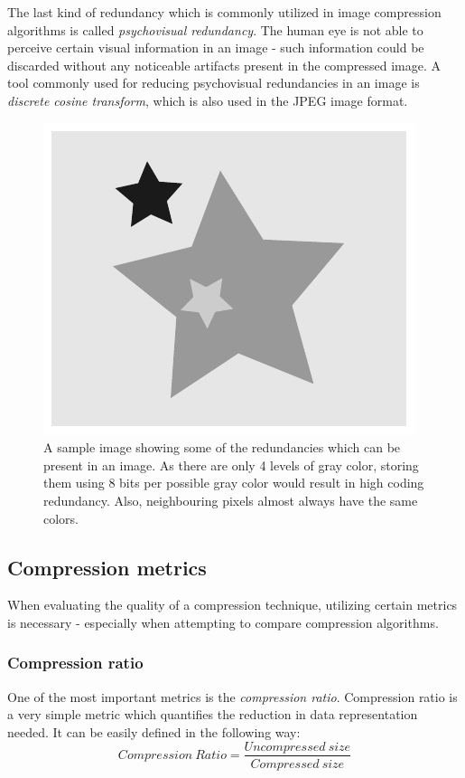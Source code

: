 \documentclass[thesis=M,english]{FITthesis}[2012/10/20]
\begin{document}
The last kind of redundancy which is commonly utilized in image compression
algorithms is called \emph{psychovisual redundancy}. The human eye is not
able to perceive certain visual information in an image - such information could
be discarded without any noticeable artifacts present in the compressed image.
A tool commonly used for reducing psychovisual redundancies in an image is
\emph{discrete cosine transform}, which is also used in the JPEG image
format.

\begin{figure}[h]
  \centering
  \includegraphics{imgs/redundancies}
  \caption[An image showing some of the redundancies which exist in images]{A sample image showing some of the redundancies which can be present in an image.
  		  As there are only 4 levels of gray color, storing them using 8 bits
  		  per possible gray color would result in high coding redundancy. Also,
  		  neighbouring pixels almost always have the same colors.}
  \label{fig:redundancies}
\end{figure}

\subsection{Compression metrics}
\label{metrics}
When evaluating the quality of a compression technique, utilizing certain
metrics is necessary - especially when attempting to compare compression
algorithms.

\subsubsection{Compression ratio}
One of the most important metrics is the \emph{compression ratio}.
Compression ratio is a very simple metric which quantifies the reduction
in data representation needed. It can be easily defined in the following
way:
\begin{equation}
Compression\ Ratio = \frac{Uncompressed\ size}{Compressed\ size}    
\end{equation}
\end{document}
